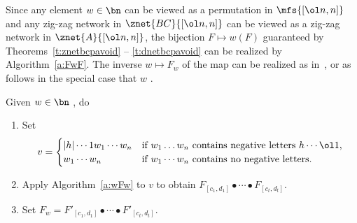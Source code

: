 Since any element $w \in \bn$ \avoidingp{}
can be viewed as a permutation in $\mfs{[\ol n,n]}$
and any zig-zag network in $\znet{BC}{[\ol n,n]}$
can be viewed as a zig-zag network in $\znet{A}{[\ol n,n]}$,
the bijection $F \mapsto w(F)$ guaranteed by
Theorems~\ref{t:znetbcpavoid} -- \ref{t:dnetbcpavoid}
can be realized by Algorithm~\ref{a:FwF}.
The inverse $w \mapsto F_w$
of the map can be realized as in~\cite[\S 3]{SkanNNDCB},
or as follows in the special case that $w$ \avoidssignedp.
\begin{alg}
  Given $w \in \bn$ \avoidingsignedp, do
  \begin{enumerate}
  \item Set
  \begin{equation*}
    v = \begin{cases}
      |h| \cdots 1 w_1 \cdots w_n
       &\text{if $w_1 \dotsc w_n$ contains negative letters $h \cdots \ol 1$,}\\
      w_1 \cdots w_n
       &\text{if $w_1 \cdots w_n$ contains no negative letters}.
    \end{cases}
  \end{equation*}
  \item Apply Algorithm~\ref{a:wFw} to $v$ to obtain
      $F_{[c_1,d_1]} \bullet \cdots \bullet F_{[c_t,d_t]}$.
  \item Set $F_w = F'_{[c_1,d_1]} \bullet \cdots \bullet F'_{[c_t,d_t]}$.
  \end{enumerate}
\end{alg}

